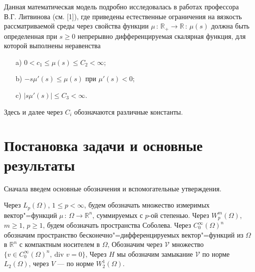 \documentclass[14pt, a4paper]{extarticle}
\numberwithin{equation}{section}
\begin{document}
    Данная математическая модель подробно исследовалась в работах профессора В.Г. Литвинова
    (см. [1]), где приведены естественные ограничения на вязкость рассматриваемой среды через
    свойства функции $\mu\, : \,\mathbb{R}_+ \rightarrow \mathbb{R}\, : \,\mu(s)$ должна быть определенная
    при $s \geq 0$ непрерывно дифференцируемая скалярная функция, для которой выполнены неравенства
    \begin{itemize}
        \item [a)] $0 < c_1 \leq \mu(s) \leq C_2 < \infty$;
        \item [b)] $-s\mu'(s) \leq \mu(s)$ при $\mu'(s) < 0$;
        \item [c)] $|s\mu'(s)| \leq C_3 < \infty$.
    \end{itemize}
    Здесь и далее через $C_i$ обозначаются различные константы.


    \section{Постановка задачи и основные результаты}

    Сначала введем основные обозначения и вспомогательные утверждения.

    Через $L_p(\Omega)$, $1 \leqslant p < \infty$, будем обозначать множество измеримых вектор"=функций 
    $\mu\, : \,\Omega \rightarrow \mathbb{R}^n$, суммируемых с $p$-ой степенью. Через $W_p^m(\Omega)$, $m \geqslant 1$, $p \geqslant 1$,
    будем обозначать пространства Соболева. Через $C_0^{\infty}(\Omega)^n$ обозначим пространство бесконечно"=дифференцируемых
    вектор"=функций из $\Omega$ в $\mathbb{R}^n$ с компактным носителем в $\Omega$, Обозначим 
    через $\mathcal{V}$ множество $\{v \in C_0^\infty(\Omega)^n, \ \textrm{div } v = 0\}$, Через $H$ мы обозначим замыкание $\mathcal{V}$ по норме 
    $L_2(\Omega)$, через $V$ --- по норме $W_2^1(\Omega)$.
\end{document}
